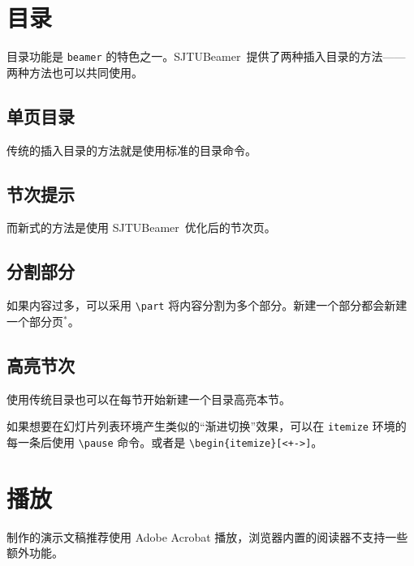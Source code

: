 \documentclass[
    UTF8,
    heading=true,
    12pt,
    a4paper
]{ctexrep}
\def\themename{\textsf{SJTUBeamer}}
\begin{document}
\chapter{目录}

目录功能是 \texttt{beamer} 的特色之一。\themename\ 提供了两种插入目录的方法——两种方法也可以共同使用。

\section{单页目录}

传统的插入目录的方法就是使用标准的目录命令。


\section{节次提示}

而新式的方法是使用 \themename\ 优化后的节次页。


\section{分割部分}

如果内容过多，可以采用 \texttt{\textbackslash{}part} 将内容分割为多个部分。新建一个部分都会新建一个部分页$^*$。


\section{高亮节次}

使用传统目录也可以在每节开始新建一个目录高亮本节。


\begin{commentlist}
  \item 如果想要在幻灯片列表环境产生类似的“渐进切换”效果，可以在 \texttt{itemize} 环境的每一条后使用 \texttt{\textbackslash{}pause} 命令。或者是 \texttt{\textbackslash{}begin\{itemize\}[<+->]}。
\end{commentlist}

\chapter{播放}

制作的演示文稿推荐使用 Adobe Acrobat 播放，浏览器内置的阅读器不支持一些额外功能。
\end{document}
